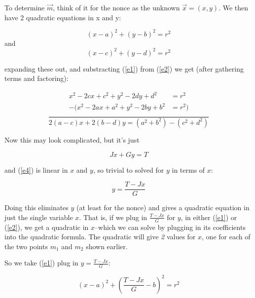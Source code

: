 \documentclass[12pt]{article}
\begin{document}
To determine $\vec{m}$, think of it for the nonce as the unknown $\vec{x}
= (x,y)$. We then have 2 quadratic equations in x and y:


\begin{equation}
{(x-a)}^2 + {(y-b)}^2 = r^2
\label{e1}
\end{equation}
and
\begin{equation}
{(x-c)}^2 + {(y-d)}^2 = r^2
\label{e2}
\end{equation}


expanding these out, and substracting (\ref{e1}) from
(\ref{e2}) we get (after gathering terms and factoring):

\begin{equation}
\frac{\begin{aligned}
	x^2-2cx+c^2+y^2-2dy+d^2&=r^2\\
      -(x^2-2ax+a^2+y^2-2by+b^2&=r^2)\\
      \end{aligned}}{2(a-c)x+2(b-d)y=(a^2+b^2)-(c^2+d^2)}
\end{equation}

Now this may look complicated, but it's just

\begin{equation}
Jx+Gy=T
\label{e4}
\end{equation}

and (\ref{e4}) is linear in $x$ and $y$, so trivial to solved for
$y$ in terms of $x$:

\begin{equation}
y = \frac{T-Jx}{G}
\label{eq5}
\end{equation}

Doing this eliminates $y$ (at least for the nonce) and gives a quadratic
equation in just the single variable $x$. That is, if we plug in
$\frac{T-Jx}{G}$ for $y$, in either (\ref{e1}) or (\ref{e2}), we get a
quadratic in $x$--which we can solve by plugging in its coefficients
into the quadratic formula.  The quadratic will give {\em 2} values for
$x$, one for each of the two points $m_1$ and $m_2$ shown earlier.

So we take (\ref{e1}) plug in $y = \frac{T-Jx}{G}$:

\begin{equation}
{(x-a)}^2+{\left(\frac{T-Jx}{G}-b\right)}^2=r^2
\label{eq6}
\end{equation}
\end{document}
